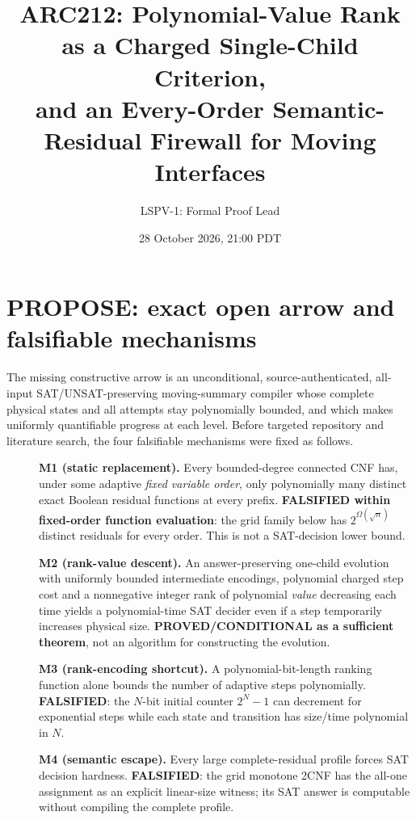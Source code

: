 \documentclass[11pt]{article}
\title{ARC212: Polynomial-Value Rank as a Charged Single-Child Criterion,\\and an Every-Order Semantic-Residual Firewall for Moving Interfaces}
\author{LSPV-1: Formal Proof Lead}
\date{28 October 2026, 21:00 PDT}
\begin{document}
\maketitle
\begin{center}\end{center}

\section{PROPOSE: exact open arrow and falsifiable mechanisms}
\noindent The missing constructive arrow is an unconditional, source-authenticated, all-input SAT/UNSAT-preserving moving-summary compiler whose complete physical states and all attempts stay polynomially bounded, and which makes uniformly quantifiable progress at each level. Before targeted repository and literature search, the four falsifiable mechanisms were fixed as follows.
\begin{description}
\item[] \textbf{M1 (static replacement).} Every bounded-degree connected CNF has, under some adaptive \emph{fixed variable order}, only polynomially many distinct exact Boolean residual functions at every prefix. \textbf{FALSIFIED within fixed-order function evaluation}: the grid family below has $2^{\Omega(\sqrt n)}$ distinct residuals for every order. This is not a SAT-decision lower bound.
\item[] \textbf{M2 (rank-value descent).} An answer-preserving one-child evolution with uniformly bounded intermediate encodings, polynomial charged step cost and a nonnegative integer rank of polynomial \emph{value} decreasing each time yields a polynomial-time SAT decider even if a step temporarily increases physical size. \textbf{PROVED/CONDITIONAL as a sufficient theorem}, not an algorithm for constructing the evolution.
\item[] \textbf{M3 (rank-encoding shortcut).} A polynomial-bit-length ranking function alone bounds the number of adaptive steps polynomially. \textbf{FALSIFIED}: the $N$-bit initial counter $2^N-1$ can decrement for exponential steps while each state and transition has size/time polynomial in $N$.
\item[] \textbf{M4 (semantic escape).} Every large complete-residual profile forces SAT decision hardness. \textbf{FALSIFIED}: the grid monotone 2CNF has the all-one assignment as an explicit linear-size witness; its SAT answer is computable without compiling the complete profile.
\end{description}
\end{document}
